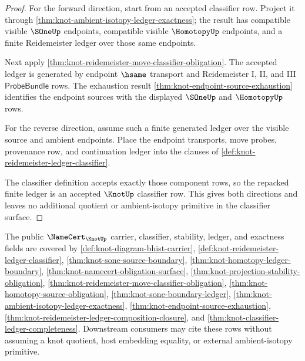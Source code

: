 \begin{proof}
For the forward direction, start from an accepted classifier row. Project it
through \autoref{thm:knot-ambient-isotopy-ledger-exactness}; the result has
compatible visible $\SOneUp$ endpoints, compatible visible $\HomotopyUp$
endpoints, and a finite Reidemeister ledger over those same endpoints.

Next apply \autoref{thm:knot-reidemeister-move-classifier-obligation}. The
accepted ledger is generated by endpoint $\hsame$ transport and
Reidemeister I, II, and III $\mathsf{ProbeBundle}$ rows. The exhaustion result
\autoref{thm:knot-endpoint-source-exhaustion} identifies the endpoint sources
with the displayed $\SOneUp$ and $\HomotopyUp$ rows.

For the reverse direction, assume such a finite generated ledger over the
visible source and ambient endpoints. Place the endpoint transports, move
probes, provenance row, and continuation ledger into the clauses of
\autoref{def:knot-reidemeister-ledger-classifier}.

The classifier definition accepts exactly those component rows, so the
repacked finite ledger is an accepted $\KnotUp$ classifier row. This gives
both directions and leaves no additional quotient or ambient-isotopy
primitive in the classifier surface.
\end{proof}

\begin{theorem}\label{thm:knot-namecert-field-coverage}
The public $\NameCert_{\KnotUp}$ carrier, classifier, stability, ledger, and
exactness fields are covered by
\autoref{def:knot-diagram-bhist-carrier},
\autoref{def:knot-reidemeister-ledger-classifier},
\autoref{thm:knot-sone-source-boundary},
\autoref{thm:knot-homotopy-ledger-boundary},
\autoref{thm:knot-namecert-obligation-surface},
\autoref{thm:knot-projection-stability-obligation},
\autoref{thm:knot-reidemeister-move-classifier-obligation},
\autoref{thm:knot-homotopy-source-obligation},
\autoref{thm:knot-sone-boundary-ledger},
\autoref{thm:knot-ambient-isotopy-ledger-exactness},
\autoref{thm:knot-endpoint-source-exhaustion},
\autoref{thm:knot-reidemeister-ledger-composition-closure}, and
\autoref{thm:knot-classifier-ledger-completeness}. Downstream consumers may
cite these rows without assuming a knot quotient, host embedding equality, or
external ambient-isotopy primitive.
\end{theorem}

